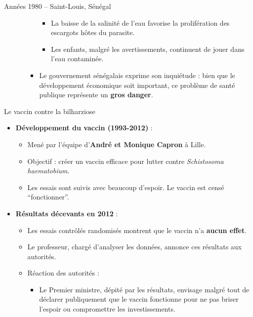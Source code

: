 \documentclass[
  ignorenonframetext,
]{beamer}
\providecommand{\tightlist}{%
  \setlength{\itemsep}{0pt}\setlength{\parskip}{0pt}}\usepackage{longtable,booktabs,array}
\begin{document}
\begin{frame}
\begin{block}{Années 1980 -- Saint-Louis, Sénégal}
\begin{itemize}
\begin{itemize}
\begin{itemize}
      \begin{itemize}
      \tightlist
      \item
        La baisse de la salinité de l'eau favorise la prolifération des
        escargots hôtes du parasite.
      \item
        Les enfants, malgré les avertissements, continuent de jouer dans
        l'eau contaminée.
      \end{itemize}
    \item
      Le gouvernement sénégalais exprime son inquiétude : bien que le
      développement économique soit important, ce problème de santé
      publique représente un \textbf{gros danger}.
    \end{itemize}
  \end{itemize}
\end{itemize}
\end{block}
\end{frame}

\begin{frame}
\begin{block}{Le vaccin contre la bilharziose}
\protect\hypertarget{le-vaccin-contre-la-bilharziose}{}
\begin{itemize}
\tightlist
\item
  \textbf{Développement du vaccin (1993-2012)} :

  \begin{itemize}
  \tightlist
  \item
    Mené par l'équipe d'\textbf{André et Monique Capron} à Lille.
  \item
    Objectif : créer un vaccin efficace pour lutter contre
    \emph{Schistosoma haematobium}.
  \item
    Les essais sont suivis avec beaucoup d'espoir. Le vaccin est censé
    ``fonctionner''.
  \end{itemize}
\item
  \textbf{Résultats décevants en 2012} :

  \begin{itemize}
  \tightlist
  \item
    Les essais contrôlés randomisés montrent que le vaccin n'a
    \textbf{aucun effet}.
  \item
    Le professeur, chargé d'analyser les données, annonce ces résultats
    aux autorités.
  \item
    Réaction des autorités :

    \begin{itemize}
    \tightlist
    \item
      Le Premier ministre, dépité par les résultats, envisage malgré
      tout de déclarer publiquement que le vaccin fonctionne pour ne pas
      briser l'espoir ou compromettre les investissements.
    \end{itemize}
  \end{itemize}
\end{itemize}
\end{block}
\end{frame}
\end{document}
